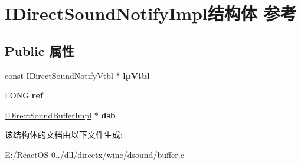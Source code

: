 \hypertarget{struct_i_direct_sound_notify_impl}{}\section{I\+Direct\+Sound\+Notify\+Impl结构体 参考}
\label{struct_i_direct_sound_notify_impl}
\subsection*{Public 属性}
\begin{DoxyCompactItemize}
\item 
\mbox{\label{struct_i_direct_sound_notify_impl_adc1687dd8f76a5c2fb0fff8ff69d2f59}} 
const I\+Direct\+Sound\+Notify\+Vtbl $\ast$ {\bfseries lp\+Vtbl}
\item 
\mbox{\label{struct_i_direct_sound_notify_impl_abfc620bf0023353d1fbff7ba3c7e6e2c}} 
L\+O\+NG {\bfseries ref}
\item 
\mbox{\label{struct_i_direct_sound_notify_impl_a1430a9d30a658c84f7b33417558c39cb}} 
\hyperlink{struct_i_direct_sound_buffer_impl}{I\+Direct\+Sound\+Buffer\+Impl} $\ast$ {\bfseries dsb}
\end{DoxyCompactItemize}


该结构体的文档由以下文件生成\+:\begin{DoxyCompactItemize}
\item 
E\+:/\+React\+O\+S-\/0../dll/directx/wine/dsound/buffer.\+c\end{DoxyCompactItemize}
